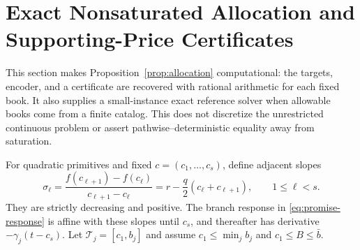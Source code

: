 \section{Exact Nonsaturated Allocation and Supporting-Price Certificates}\label{ec:allocation}
This section makes Proposition~\ref{prop:allocation} computational: the targets, encoder, and a certificate are recovered with rational arithmetic for each fixed book. It also supplies a small-instance exact reference solver when allowable books come from a finite catalog. This does not discretize the unrestricted continuous problem or assert pathwise--deterministic equality away from saturation.

For quadratic primitives and fixed $c=(c_1,\ldots,c_s)$, define adjacent slopes
\[
 \sigma_\ell=\frac{f(c_{\ell+1})-f(c_\ell)}{c_{\ell+1}-c_\ell}
 =r-\frac q2(c_\ell+c_{\ell+1}),\qquad 1\leq\ell<s.
\]
They are strictly decreasing and positive. The branch response in \eqref{eq:promise-response} is affine with these slopes until $c_s$, and thereafter has derivative $-\gamma_j(t-c_s)$. Let $\mathcal T_j=[c_1,b_j]$ and assume $c_1\leq\min_j b_j$ and $c_1\leq B\leq\bar b$.

